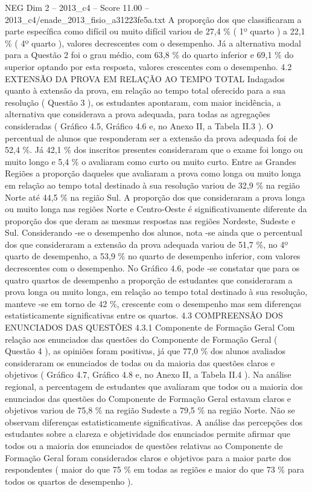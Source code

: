 \begin{textsample}{NEG Dim 2 – 2013\_c4 – Score 11.00 – 2013\_c4/enade\_2013\_fisio\_a31223fe5a.txt}
A proporção dos que classificaram a parte específica como difícil ou muito difícil variou de 27,4 \% ( 1º quarto ) a 22,1 \% ( 4º quarto ), valores decrescentes com o desempenho.
Já a alternativa modal para a Questão 2 foi o grau médio, com 63,8 \% do quarto inferior e 69,1 \% do superior optando por esta resposta, valores crescentes com o desempenho. 4.2 EXTENSÃO DA PROVA EM RELAÇÃO AO TEMPO TOTAL Indagados quanto à extensão da prova, em relação ao tempo total oferecido para a sua resolução ( Questão 3 ), os estudantes apontaram, com maior incidência, a alternativa que considerava a prova adequada, para todas as agregações consideradas ( Gráfico 4.5, Gráfico 4.6 e, no Anexo II, a Tabela II.3 ).
O percentual de alunos que responderam ser a extensão da prova adequada foi de 52,4 \%.
Já 42,1 \% dos inscritos presentes consideraram que o exame foi longo ou muito longo e 5,4 \% o avaliaram como curto ou muito curto.
Entre as Grandes Regiões a proporção daqueles que avaliaram a prova como longa ou muito longa em relação ao tempo total destinado à sua resolução variou de 32,9 \% na região Norte até 44,5 \% na região Sul.
A proporção dos que consideraram a prova longa ou muito longa nas regiões Norte e Centro-Oeste é significativamente diferente da proporção dos que deram as mesmas respostas nas regiões Nordeste, Sudeste e Sul.
Considerando -se o desempenho dos alunos, nota -se ainda que o percentual dos que consideraram a extensão da prova adequada variou de 51,7 \%, no 4º quarto de desempenho, a 53,9 \% no quarto de desempenho inferior, com valores decrescentes com o desempenho.
No Gráfico 4.6, pode -se constatar que para os quatro quartos de desempenho a proporção de estudantes que consideraram a prova longa ou muito longa, em relação ao tempo total destinado à sua resolução, manteve -se em torno de 42 \%, crescente com o desempenho mas sem diferenças estatisticamente significativas entre os quartos. 4.3 COMPREENSÃO DOS ENUNCIADOS DAS QUESTÕES 4.3.1 Componente de Formação Geral Com relação aos enunciados das questões do Componente de Formação Geral ( Questão 4 ), as opiniões foram positivas, já que 77,0 \% dos alunos avaliados consideraram os enunciados de todas ou da maioria das questões claros e objetivos ( Gráfico 4.7, Gráfico 4.8 e, no Anexo II, a Tabela II.4 ).
Na análise regional, a percentagem de estudantes que avaliaram que todos ou a maioria dos enunciados das questões do Componente de Formação Geral estavam claros e objetivos variou de 75,8 \% na região Sudeste a 79,5 \% na região Norte.
Não se observam diferenças estatisticamente significativas.
A análise das percepções dos estudantes sobre a clareza e objetividade dos enunciados permite afirmar que todos ou a maioria dos enunciados de questões relativas ao Componente de Formação Geral foram considerados claros e objetivos para a maior parte dos respondentes ( maior do que 75 \% em todas as regiões e maior do que 73 \% para todos os quartos de desempenho ).

\end{textsample}

